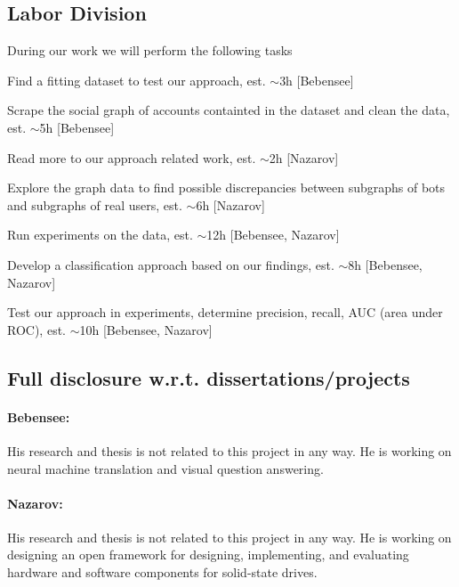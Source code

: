 
\subsection{Labor Division}

During our work we will perform the following tasks
\bit
\item Find a fitting dataset to test our approach, est. $\sim$3h [Bebensee]
\item Scrape the social graph of accounts containted in the dataset and clean the data, est. $\sim$5h [Bebensee]
\item Read more to our approach related work, est. $\sim$2h [Nazarov]
\item Explore the graph data to find possible discrepancies between subgraphs of bots and subgraphs of real users, est. $\sim$6h [Nazarov]
\item Run experiments on the data, est. $\sim$12h [Bebensee, Nazarov]
\item Develop a classification approach based on our findings, est. $\sim$8h [Bebensee, Nazarov]
\item Test our approach in experiments, determine precision, recall, AUC (area under ROC), est. $\sim$10h [Bebensee, Nazarov]
\eit

\subsection{Full disclosure w.r.t. dissertations/projects}

\paragraph{Bebensee:}
His research and thesis is not related to this project in any way. He is working on neural machine translation and visual question answering.

\paragraph{Nazarov:}
His research and thesis is not related to this project in any way. He is working on designing an open framework for designing, implementing, and evaluating hardware and software components for solid-state drives. 